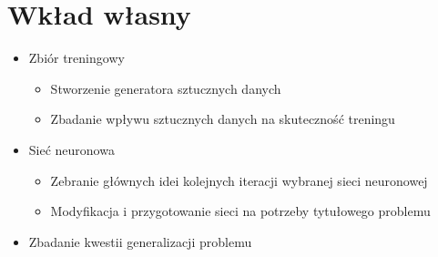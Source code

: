 \section{Wkład własny}


\begin{itemize}
	\item Zbiór treningowy
		\begin{itemize}
			\item Stworzenie generatora sztucznych danych
			\item Zbadanie wpływu sztucznych danych na skuteczność treningu
		\end{itemize}
	\item Sieć neuronowa
	\begin{itemize}
		\item Zebranie głównych idei kolejnych iteracji wybranej sieci neuronowej
		\item Modyfikacja i przygotowanie sieci na potrzeby tytułowego problemu
	\end{itemize}
	\item Zbadanie kwestii generalizacji problemu
\end{itemize}
